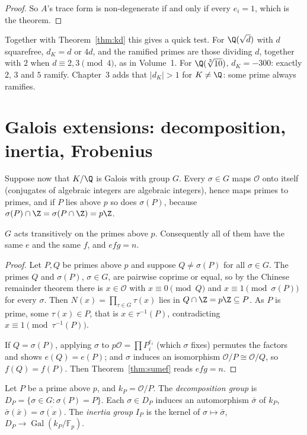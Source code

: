 \begin{proof}
So $A$'s trace form is non-degenerate if and only if every $e_i=1$, which is the theorem.
\end{proof}

Together with Theorem~\ref{thm:kd} this gives a quick test. For $\Q(\sqrt d)$ with $d$ squarefree, $d_K=d$ or $4d$, and
the ramified primes are those dividing $d$, together with $2$ when $d\equiv2,3\pmod4$, as in Volume~1. For
$\Q(\sqrt[3]{10})$, $d_K=-300$: exactly $2$, $3$ and $5$ ramify. Chapter~3 adds that $|d_K|>1$ for $K\ne\Q$: some prime
always ramifies.

\section{Galois extensions: decomposition, inertia, Frobenius}

Suppose now that $K/\Q$ is Galois with group $G$. Every $\sigma\in G$ maps $\mathcal O$ onto itself (conjugates of
algebraic integers are algebraic integers), hence maps primes to primes, and if $P$ lies above $p$ so does $\sigma(P)$,
because $\sigma(P)\cap\Z=\sigma(P\cap\Z)=p\Z$.

\begin{theorem}\label{thm:transitive}
$G$ acts transitively on the primes above $p$. Consequently all of them have the same $e$ and the same $f$, and
$efg=n$.
\end{theorem}
\begin{proof}
Let $P,Q$ be primes above $p$ and suppose $Q\ne\sigma(P)$ for all $\sigma\in G$. The primes $Q$ and $\sigma(P)$, $\sigma\in
G$, are pairwise coprime or equal, so by the Chinese remainder theorem there is $x\in\mathcal O$ with $x\equiv0\pmod Q$
and $x\equiv1\pmod{\sigma(P)}$ for every $\sigma$. Then $N(x)=\prod_{\tau\in G}\tau(x)$ lies in $Q\cap\Z=p\Z\subseteq P$.
As $P$ is prime, some $\tau(x)\in P$, that is $x\in\tau^{-1}(P)$, contradicting $x\equiv1\pmod{\tau^{-1}(P)}$.

If $Q=\sigma(P)$, applying $\sigma$ to $p\mathcal O=\prod P_i^{e_i}$ (which $\sigma$ fixes) permutes the factors and
shows $e(Q)=e(P)$; and $\sigma$ induces an isomorphism $\mathcal O/P\cong\mathcal O/Q$, so $f(Q)=f(P)$. Then
Theorem~\ref{thm:sumef} reads $efg=n$.
\end{proof}

\begin{definition}
Let $P$ be a prime above $p$, and $k_P=\mathcal O/P$. The \emph{decomposition group} is $D_P=\{\sigma\in G:\sigma(P)=P\}$.
Each $\sigma\in D_P$ induces an automorphism $\bar\sigma$ of $k_P$, $\bar\sigma(\bar x)=\overline{\sigma(x)}$. The
\emph{inertia group} $I_P$ is the kernel of $\sigma\mapsto\bar\sigma$, $D_P\to\operatorname{Gal}(k_P/\mathbb F_p)$.
\end{definition}

